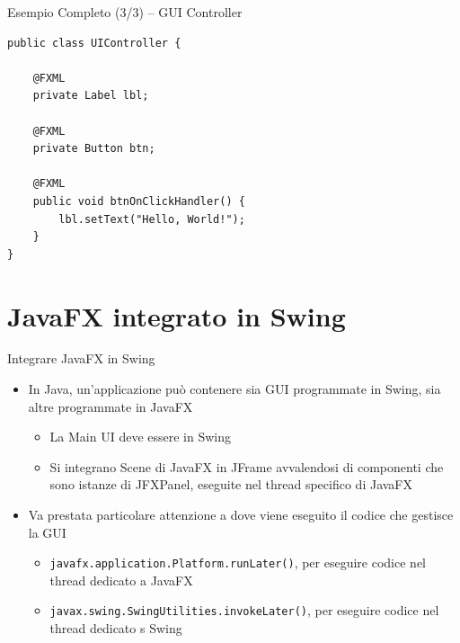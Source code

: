 \documentclass[presentation]{beamer}
\begin{document}
\begin{frame}[fragile]{Esempio Completo (3/3) -- GUI Controller}
\begin{lstlisting}
public class UIController {

	@FXML
	private Label lbl;
	
	@FXML
	private Button btn;
	
	@FXML
	public void btnOnClickHandler() {
		lbl.setText("Hello, World!");
	}
}
\end{lstlisting}
\end{frame}

\section{JavaFX integrato in Swing}

\begin{frame}{Integrare JavaFX in Swing}
\begin{itemize}\itemsep20pt
\item In Java, un'applicazione può contenere sia GUI programmate in Swing, sia altre programmate in JavaFX
\begin{itemize}
\item La Main UI deve essere in Swing
\item Si integrano Scene di JavaFX in JFrame avvalendosi di componenti che sono istanze di JFXPanel, eseguite nel thread specifico di JavaFX
\end{itemize}
\item Va prestata particolare attenzione a dove viene eseguito il codice che gestisce la GUI
\begin{itemize}
\item \texttt{javafx.application.Platform.runLater()}, per eseguire codice nel thread dedicato a JavaFX
\item \texttt{javax.swing.SwingUtilities.invokeLater()}, per eseguire codice nel thread dedicato s Swing
\end{itemize}
\end{itemize}
\end{frame}
\end{document}
